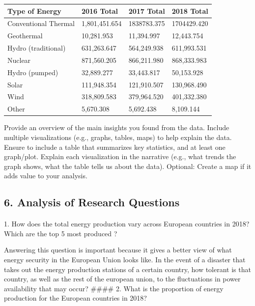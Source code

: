 \documentclass[
  letterpaper,
  DIV=11,
  numbers=noendperiod]{scrartcl}
\makeatletter
\let\oldparagraph\paragraph
\renewcommand{\paragraph}{
    \@ifstar
      \xxxParagraphStar
      \xxxParagraphNoStar
  }
\newcommand{\xxxParagraphStar}[1]{\oldparagraph*{#1}\mbox{}}
\newcommand{\xxxParagraphNoStar}[1]{\oldparagraph{#1}\mbox{}}
\makeatother
\begin{document}
\begin{longtable}[]{@{}llll@{}}
\toprule\noalign{}
Type of Energy & 2016 Total & 2017 Total & 2018 Total \\
\midrule\noalign{}
\endhead
\bottomrule\noalign{}
\endlastfoot
Conventional Thermal & 1,801,451.654 & 1838783.375 & 1704429.420 \\
Geothermal & 10,281.953 & 11,394.997 & 12,443.754 \\
Hydro (traditional) & 631,263.647 & 564,249.938 & 611,993.531 \\
Nuclear & 871,560.205 & 866,211.980 & 868,333.983 \\
Hydro (pumped) & 32,889.277 & 33,443.817 & 50,153.928 \\
Solar & 111,948.354 & 121,910.507 & 130,968.490 \\
Wind & 318,809.583 & 379,964.520 & 401,332.380 \\
Other & 5,670.308 & 5,692.438 & 8,109.144 \\
\end{longtable}

Provide an overview of the main insights you found from the data.
Include multiple visualizations (e.g., graphs, tables, maps) to help
explain the data. Ensure to include a table that summarizes key
statistics, and at least one graph/plot. Explain each visualization in
the narrative (e.g., what trends the graph shows, what the table tells
us about the data). Optional: Create a map if it adds value to your
analysis.~

\subsection{6. Analysis of Research
Questions~}\label{analysis-of-research-questions}

\paragraph{1. How does the total energy production vary across European
countries in 2018? Which are the top 5 most produced
?}\label{how-does-the-total-energy-production-vary-across-european-countries-in-2018-which-are-the-top-5-most-produced}

Answering this question is important because it gives a better view of
what energy security in the European Union looks like. In the event of a
disaster that takes out the energy production stations of a certain
country, how tolerant is that country, as well as the rest of the
european union, to the fluctuations in power availability that may
occur? \#\#\#\# 2. What is the proportion of energy production for the
European countries in 2018?
\end{document}
